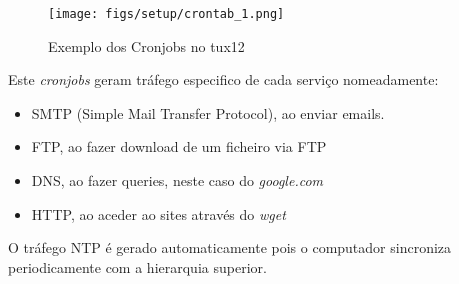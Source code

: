 \begin{figure}
    \centering
    \texttt{[image: figs/setup/crontab\_1.png]}
    \caption{Exemplo dos Cronjobs no tux12}
    \label{fig:crontab_1}
\end{figure}

Este \textit{cronjobs} geram tráfego especifico de cada serviço nomeadamente:
\begin{itemize}
    \item SMTP (Simple Mail Transfer Protocol), ao enviar emails.
    \item FTP, ao fazer download de um ficheiro via FTP
    \item DNS, ao fazer queries, neste caso do \textit{google.com}
    \item HTTP, ao aceder ao sites através do \textit{wget}
\end{itemize}

O tráfego NTP é gerado automaticamente pois o computador sincroniza periodicamente com a hierarquia superior.



